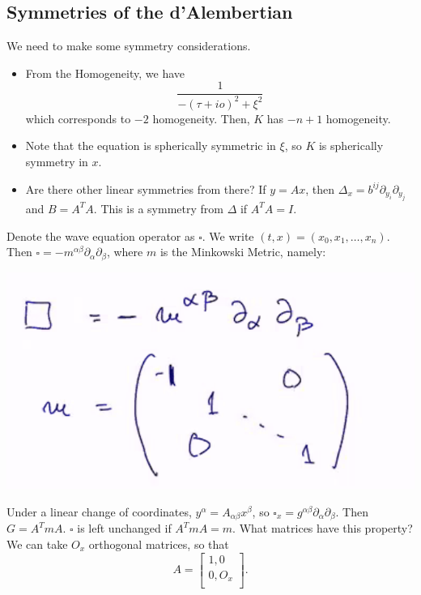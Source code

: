 \documentclass[12pt]{scrartcl}
\begin{document}
\subsection{Symmetries of the d'Alembertian}
We need to make some symmetry considerations.  
\begin{itemize}
\item From the Homogeneity, we have 
$$\frac{1}{-(\tau + io)^2 + \xi^2}$$
which corresponds to $-2$ homogeneity.  Then, $K$ has $-n+1$ homogeneity.
\item Note that the equation is spherically symmetric in $\xi$, so $K$ is spherically symmetry in $x$.
\item Are there other linear symmetries from there?  If $y = Ax$,  then $\Delta_x = b^{ij} \partial_{y_i} \partial_{y_j}$ and $B = A^TA$.  This is a symmetry from $\Delta$ if $A^TA = I$.  
\end{itemize}
Denote the wave equation operator as $\square$.  We write $(t, x) = (x_0, x_1, \dots, x_n)$.  Then $\square = -m^{\alpha \beta}\partial_\alpha \partial_\beta$, where $m$ is the Minkowski Metric, namely:
\begin{center}
\includegraphics[scale=0.6]{minkowski.png}
\end{center}
Under a linear change of coordinates, $y^\alpha = A_{\alpha \beta}x^{\beta}$, so $\square_x = g^{\alpha \beta}\partial_\alpha \partial_\beta$.  Then $G = A^TmA$.  $\square$ is left unchanged if $A^TmA = m$.  What matrices have this property? 
We can take $O_x$ orthogonal matrices, so that $$A = \begin{bmatrix}
1 , 0\\ 
0, O_x \\
\end{bmatrix}.$$
\end{document}
